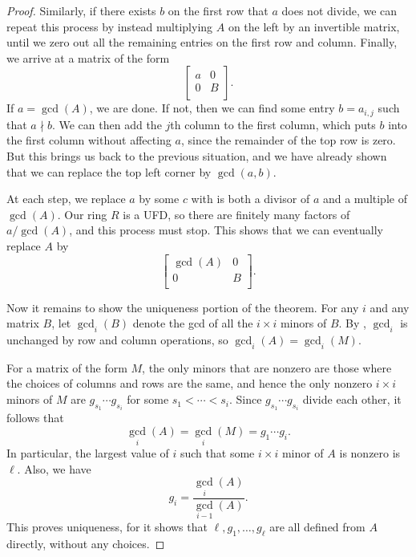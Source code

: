 \documentclass[12pt]{report}
\numberwithin{equation}{section}
\numberwithin{theorem}{chapter}
\theoremstyle{definition}
\newtheorem*{basic properties}{Basic Properties}
\newtheorem*{Important Remark}{Important Remark}
\begin{document}
\begin{proof}
Similarly, if there exists $b$ on the first row that $a$ does not divide, we can repeat this process by instead multiplying $A$ on the left by an invertible matrix, until we zero out all the remaining entries on the first row and column.
Finally, we arrive at a matrix of the form 
$$\begin{bmatrix}
a & 0 \\
0 & B \\
\end{bmatrix}.$$
If $a = \gcd(A)$, we are done. If not, then we can find some entry $b=a_{i,j}$ such that $a \nmid b$. We can then add the $j$th column to the first column, which puts $b$ into the first column without affecting $a$, since the remainder of the top row is zero. But this brings us back to the previous situation, and we have already shown that we can replace the top left corner by $\gcd(a,b)$.

At each step, we replace $a$ by some $c$ with is both a divisor of $a$ and a multiple of $\gcd(A)$. Our ring $R$ is a UFD, so there are finitely many factors of $a/\gcd(A)$, and this process must stop. This shows that we can eventually replace $A$ by
$$\begin{bmatrix}
\gcd(A) & 0 \\
0 & B \\
\end{bmatrix}.$$



Now it remains to show the uniqueness portion of the theorem. 
For any $i$ and any matrix $B$, let $\gcd_i(B)$ denote the gcd of all the $i \times i$ minors of $B$. 
By , $\gcd_i$ is unchanged by row and column operations, so $\gcd_i(A) = \gcd_i(M)$.

For a matrix of the form $M$, the only minors that are nonzero are those where the choices of columns and rows are the same, and hence the only nonzero $i \times i$ minors of $M$ are $g_{s_1} \cdots g_{s_i}$ for some $s_1 < \cdots < s_i$. Since $g_{s_1} \cdots g_{s_i}$ divide each other, it follows that
$${\gcd}_i(A) = {\gcd}_i(M) = g_1 \cdots g_i.$$ 
In particular, the largest value of $i$ such that some $i \times i$ minor of $A$ is nonzero is $\ell$. Also, we have
$$g_i = \frac{\gcd_i(A)}{\gcd_{i-1}(A)}.$$
This proves uniqueness, for it shows that $\ell, g_1, \dots, g_{\ell}$ are all defined from $A$ directly, without any choices.
\end{proof}
\end{document}
